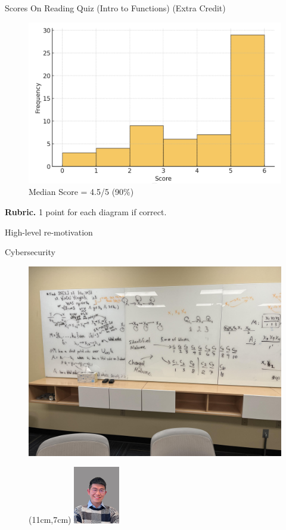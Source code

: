 \documentclass[10pt]{beamer}
\begin{document}
\begin{frame}{Scores On Reading Quiz (Intro to Functions) (Extra Credit)}
\footnotesize 
\begin{figure}[ht]
        \centering
        \includegraphics[width=.75\textwidth]{images/reading_quiz_scores}
   		 \caption{Median Score = 4.5/5 (90\%)}
\end{figure}
\vfill 
\textbf{Rubric.}  1 point for each diagram if correct.

\end{frame}


\begin{frame}[standout]
High-level re-motivation
\end{frame}


\begin{frame}{Cybersecurity}
\footnotesize 
\begin{figure}[ht]
        \centering
        \includegraphics[width=.8\textwidth]{images/cyber}
   		 
   		 \begin{textblock*}{-3cm}(11cm,7cm)  %
        \includegraphics[width=2cm]{images/fangtian_zhong.jpg}  %
    \end{textblock*}
    
\end{figure}
\end{frame}
\end{document}

